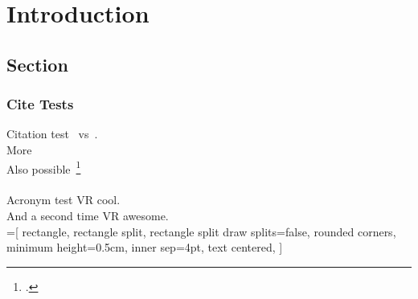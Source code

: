
\chapter{Introduction}\label{chapter:asdf}

\section{Section}


\subsection{Cite Tests}
Citation test~\parencite{Afonso.2017} vs~\cite{Afonso.2017}.\\
More~\cite[pre][post]{Afonso.2017}\\
Also possible~\footcite{Afonso.2017}\\
\\
Acronym test \ac{VR} cool.\\
And a second time \ac{VR} awesome.\\

=[
  rectangle,
  rectangle split, 
  rectangle split draw splits=false,
  rounded corners,
  minimum height=0.5cm,
  inner sep=4pt,
  text centered,
]

